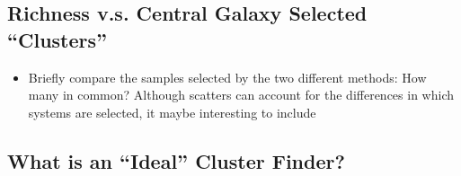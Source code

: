 \documentclass[fleqn,usenatbib,useAMS,english]{mnras}
\begin{document}
\subsection{Richness v.s. Central Galaxy Selected ``Clusters''}
    \label{sec:cause_of_difference}



    \begin{itemize}

        \item Briefly compare the samples selected by the two different methods: How many in
            common? Although scatters can account for the differences in which systems are selected,
            it maybe interesting to include

    \end{itemize}

\subsection{What is an ``Ideal'' Cluster Finder?}
    \label{sec:perfect_finder}

\end{document}
